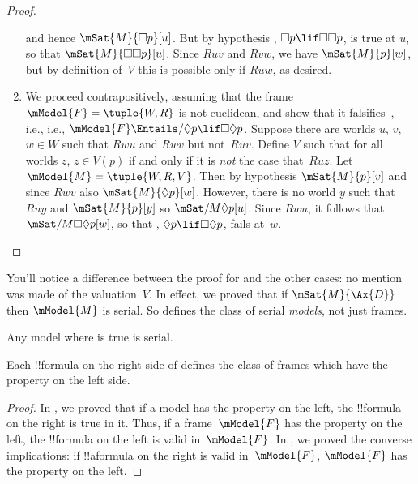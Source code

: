 \documentclass[../../../include/open-logic-section]{subfiles}
\begin{document}
\begin{proof}
\begin{enumerate}
    and hence $\mSat{M}{\Box p}[u]$. But by hypothesis , $\Box p
    \lif \Box \Box p$, is true at $u$, so that $\mSat{M}{\Box \Box
      p}[u]$. Since $Ruv$ and $Rvw$, we have $\mSat{M}{p}[w]$, but by
    definition of~$V$ this is possible only if $Ruw$, as desired.
  \item We proceed contrapositively, assuming that the frame
    $\mModel{F} = \tuple{W, R}$ is not euclidean, and show that it
    falsifies~, i.e., i.e., $\mModel{F} \Entails/ \Diamond p \lif
      \Box\Diamond p$. Suppose there are worlds $u$, $v$, $w \in W$
    such that $Rwu$ and $Rwv$ but not~$Ruv$. Define $V$ such that for
    all worlds $z$, $z \in V(p)$ if and only if it is \emph{not} the
    case that~$Ruz$. Let $\mModel{M} =\tuple{W, R, V}$. Then by
    hypothesis $\mSat{M}{p}[v]$ and since $Rwv$ also
    $\mSat{M}{\Diamond p}[w]$. However, there is no world $y$ such
    that $Ruy$ and $\mSat{M}{p}[y]$ so $\mSat/{M}{\Diamond
      p}[u]$. Since $Rwu$, it follows that $\mSat/{M}{\Box\Diamond
      p}[w]$, so that , $\Diamond p \lif \Box\Diamond p$, fails
    at~$w$.
  \end{enumerate}
\end{proof}

You'll notice a difference between the proof for  and the other
cases: no mention was made of the valuation~$V$. In effect, we proved
that if $\mSat{M}{\Ax{D}}$ then $\mModel{M}$ is serial. So 
defines the class of serial \emph{models}, not just frames.

\begin{cor}
  Any model where  is true is serial.
\end{cor}

\begin{cor}
Each !!{formula} on the right side of  defines
the class of frames which have the property on the left side.
\end{cor}

\begin{proof}
  In , we proved that if a model has the
  property on the left, the !!{formula} on the right is true in
  it. Thus, if a frame~$\mModel{F}$ has the property on the left, the
  !!{formula} on the left is valid in~$\mModel{F}$. In
  , we proved the converse implications:
  if !!a{formula} on the right is valid in~$\mModel{F}$, $\mModel{F}$
  has the property on the left.
\end{proof}
\end{document}
